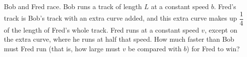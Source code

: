 Bob and Fred race. Bob runs a track of length $L$ at a constant speed $b$. Fred's track is Bob's track with an extra curve added, and this extra curve makes up $\dfrac14$ of the length of Fred's whole track. Fred runs at a constant speed $v$, except on the extra curve, where he runs at half that speed. How much faster than Bob must Fred run (that is, how large must $v$ be compared with $b$) for Fred to win?
